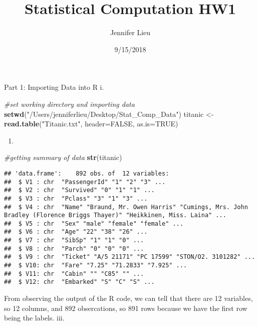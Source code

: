 \documentclass[]{article}
\title{Statistical Computation HW1}
\author{Jennifer Lieu}
\date{9/15/2018}
\newenvironment{Shaded}{\begin{snugshade}}{\end{snugshade}}
\newcommand{\KeywordTok}[1]{\textcolor[rgb]{0.13,0.29,0.53}{\textbf{#1}}}
\newcommand{\DataTypeTok}[1]{\textcolor[rgb]{0.13,0.29,0.53}{#1}}
\newcommand{\StringTok}[1]{\textcolor[rgb]{0.31,0.60,0.02}{#1}}
\newcommand{\CommentTok}[1]{\textcolor[rgb]{0.56,0.35,0.01}{\textit{#1}}}
\newcommand{\OtherTok}[1]{\textcolor[rgb]{0.56,0.35,0.01}{#1}}
\newcommand{\NormalTok}[1]{#1}
\begin{document}
\maketitle

Part 1: Importing Data into R i.

\begin{Shaded}
\begin{Highlighting}[]
\CommentTok{#set working directory and importing data}
\KeywordTok{setwd}\NormalTok{(}\StringTok{"/Users/jenniferlieu/Desktop/Stat_Comp_Data"}\NormalTok{)}
\NormalTok{titanic <-}\StringTok{ }\KeywordTok{read.table}\NormalTok{(}\StringTok{"Titanic.txt"}\NormalTok{, }\DataTypeTok{header=}\OtherTok{FALSE}\NormalTok{, }\DataTypeTok{as.is=}\OtherTok{TRUE}\NormalTok{)}
\end{Highlighting}
\end{Shaded}

\begin{enumerate}
\def\labelenumi{\roman{enumi}.}
\setcounter{enumi}{1}
\item
\end{enumerate}

\begin{Shaded}
\begin{Highlighting}[]
\CommentTok{#getting summary of data}
\KeywordTok{str}\NormalTok{(titanic)}
\end{Highlighting}
\end{Shaded}

\begin{verbatim}
## 'data.frame':    892 obs. of  12 variables:
##  $ V1 : chr  "PassengerId" "1" "2" "3" ...
##  $ V2 : chr  "Survived" "0" "1" "1" ...
##  $ V3 : chr  "Pclass" "3" "1" "3" ...
##  $ V4 : chr  "Name" "Braund, Mr. Owen Harris" "Cumings, Mrs. John Bradley (Florence Briggs Thayer)" "Heikkinen, Miss. Laina" ...
##  $ V5 : chr  "Sex" "male" "female" "female" ...
##  $ V6 : chr  "Age" "22" "38" "26" ...
##  $ V7 : chr  "SibSp" "1" "1" "0" ...
##  $ V8 : chr  "Parch" "0" "0" "0" ...
##  $ V9 : chr  "Ticket" "A/5 21171" "PC 17599" "STON/O2. 3101282" ...
##  $ V10: chr  "Fare" "7.25" "71.2833" "7.925" ...
##  $ V11: chr  "Cabin" "" "C85" "" ...
##  $ V12: chr  "Embarked" "S" "C" "S" ...
\end{verbatim}

From observing the output of the R code, we can tell that there are 12
variables, so 12 columns, and 892 obsercations, so 891 rows because we
have the first row being the labels. iii.
\end{document}
